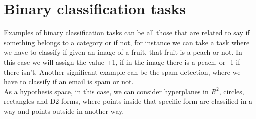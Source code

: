 \section{Binary classification tasks}

Examples of binary classification tasks can be all those that are related to say if something belongs to a category or if not, for instance we can take a task where we have to classify if given an image of a fruit, that fruit is a peach or not. In this case we will assign the value +1, if in the image there is a peach, or -1 if there isn’t. Another significant example can be the spam detection, where we have to classify if an email is spam or not. \\

As a hypothesis space, in this case, we can consider hyperplanes in $R^{2}$, circles, rectangles and D2 forms, where points inside that specific form are classified in a way and points outside in another way.
